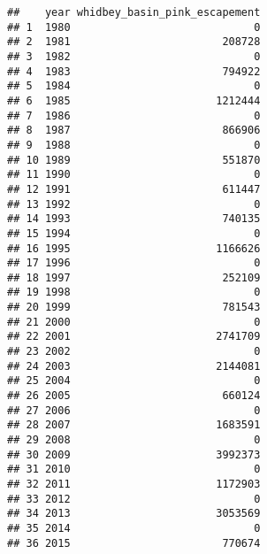 \documentclass[11pt,]{article}
\newenvironment{Shaded}{}{}
\newcommand{\KeywordTok}[1]{\textcolor[rgb]{0.00,0.00,1.00}{#1}}
\newcommand{\DecValTok}[1]{#1}
\newcommand{\StringTok}[1]{\textcolor[rgb]{0.00,0.50,0.50}{#1}}
\newcommand{\OperatorTok}[1]{#1}
\newcommand{\NormalTok}[1]{#1}
\begin{document}
\begin{verbatim}
##    year whidbey_basin_pink_escapement
## 1  1980                             0
## 2  1981                        208728
## 3  1982                             0
## 4  1983                        794922
## 5  1984                             0
## 6  1985                       1212444
## 7  1986                             0
## 8  1987                        866906
## 9  1988                             0
## 10 1989                        551870
## 11 1990                             0
## 12 1991                        611447
## 13 1992                             0
## 14 1993                        740135
## 15 1994                             0
## 16 1995                       1166626
## 17 1996                             0
## 18 1997                        252109
## 19 1998                             0
## 20 1999                        781543
## 21 2000                             0
## 22 2001                       2741709
## 23 2002                             0
## 24 2003                       2144081
## 25 2004                             0
## 26 2005                        660124
## 27 2006                             0
## 28 2007                       1683591
## 29 2008                             0
## 30 2009                       3992373
## 31 2010                             0
## 32 2011                       1172903
## 33 2012                             0
## 34 2013                       3053569
## 35 2014                             0
## 36 2015                        770674
\end{verbatim}

\begin{Shaded}
\end{Shaded}
\end{document}

